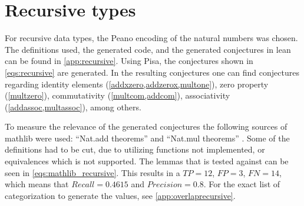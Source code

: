 \section{Recursive types}\label{sec:result:recursive}
For recursive data types, the Peano encoding of the natural numbers was chosen.
The definitions used, the generated code, and the generated conjectures in lean can be found in \cref{app:recursive}.
Using Pisa, the conjectures shown in \cref{eqs:recursive} are generated.
In the resulting conjectures one can find conjectures regarding identity elements (\cref{addxzero,addzerox,multone}), zero property (\cref{multzero}), commutativity (\cref{multcom,addcom}), associativity (\cref{addassoc,multassoc}), among others.

To measure the relevance of the generated conjectures the following sources of mathlib were used: ``Nat.add theorems'' \autocite{Nat.add} and ``Nat.mul theorems'' \autocite{Nat.mul}.
Some of the definitions had to be cut, due to utilizing functions not implemented, or equivalences which is not supported.
The lemmas that is tested against can be seen in \cref{eqs:mathlib_recursive}.
This results in a $TP = 12$, $FP = 3$, $FN = 14$, which means that $Recall = 0.4615$ and $Precision = 0.8$.
For the exact list of categorization to generate the values, see \cref{app:overlaprecursive}.

